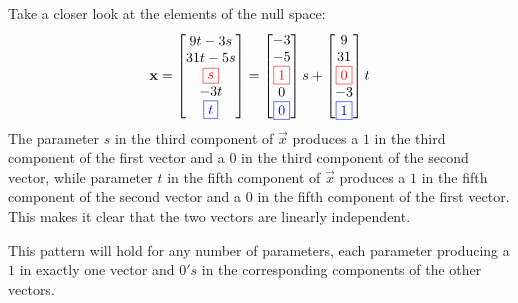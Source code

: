 \documentclass{ximera}
\begin{document}
Take a closer look at the elements of the null space:
$$\vec{x}=\begin{bmatrix}9t-3s\\31t-5s\\{\color{red}\fbox{$s$}}\\-3t\\{\color{blue}\fbox{$t$}}\end{bmatrix}=\begin{bmatrix}-3\\-5\\{\color{red}\fbox{$1$}}\\0\\{\color{blue}\fbox{$0$}}\end{bmatrix}s+\begin{bmatrix}9\\31\\{\color{red}\fbox{$0$}}\\-3\\{\color{blue}\fbox{$1$}}\end{bmatrix}t$$
The parameter $s$ in the third component of $\vec{x}$ produces a $1$ in the third component of the first vector and a $0$ in the third component of the second vector, while parameter $t$ in the fifth component of $\vec{x}$ produces a $1$ in the fifth component of the second vector and a $0$ in the fifth component of the first vector. This makes it clear that the two vectors are linearly independent.  

This pattern will hold for any number of parameters, each parameter producing a $1$ in exactly one vector and $0's$ in the corresponding components of the other vectors.
\end{document}
